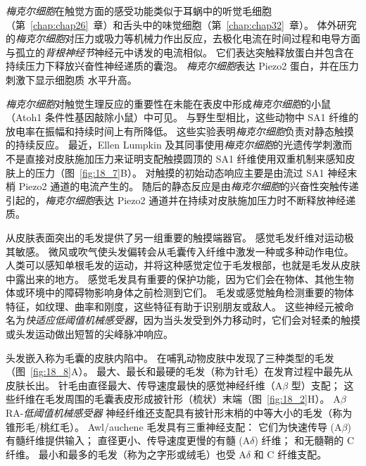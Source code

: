 \textit{梅克尔细胞}在触觉方面的感受功能类似于耳蜗中的听觉毛细胞（第~\ref{chap:chap26}~章）和舌头中的味觉细胞（第~\ref{chap:chap32}~章）。
体外研究的\textit{梅克尔细胞}对压力或吸力等机械力作出反应，去极化电流在时间过程和电导方面与孤立的\textit{背根神经节}神经元中诱发的电流相似。
它们表达突触释放蛋白并包含在持续压力下释放兴奋性神经递质的囊泡。
\textit{梅克尔细胞}表达 Piezo2 蛋白，并在压力刺激下显示细胞质  水平升高。


\textit{梅克尔细胞}对触觉生理反应的重要性在未能在表皮中形成\textit{梅克尔细胞}的小鼠（Atoh1 条件性基因敲除小鼠）中可见。
与野生型相比，这些动物中 SA1 纤维的放电率在振幅和持续时间上有所降低。
这些实验表明\textit{梅克尔细胞}负责对静态触摸的持续反应。 
最近，Ellen Lumpkin 及其同事使用\textit{梅克尔细胞}的光遗传学刺激而不是直接对皮肤施加压力来证明支配触摸圆顶的 SA1 纤维使用双重机制来感知皮肤上的压力（图~\ref{fig:18_7}B）。
对触摸的初始动态响应主要是由流过 SA1 神经末梢 Piezo2 通道的电流产生的。
随后的静态反应是由\textit{梅克尔细胞}的兴奋性突触传递引起的，\textit{梅克尔细胞}表达 Piezo2 通道并在持续对皮肤施加压力时不断释放神经递质。


从皮肤表面突出的毛发提供了另一组重要的触摸端器官。 
感觉毛发纤维对运动极其敏感。
微风或吹气使头发偏转会从毛囊传入纤维中激发一种或多种动作电位。
人类可以感知单根毛发的运动，并将这种感觉定位于毛发根部，也就是毛发从皮肤中露出来的地方。
感觉毛发具有重要的保护功能，因为它们会在物体、其他生物体或环境中的障碍物影响身体之前检测到它们。
毛发或感觉触角检测重要的物体特征，如纹理、曲率和刚度，这些特征有助于识别朋友或敌人。
这些神经元被命名为\textit{快适应低阈值机械感受器}，因为当头发受到外力移动时，它们会对轻柔的触摸或头发运动做出短暂的尖峰脉冲响应。


头发嵌入称为毛囊的皮肤内陷中。
在哺乳动物皮肤中发现了三种类型的毛发（图~\ref{fig:18_8}A）。
最大、最长和最硬的毛发（称为针毛）在发育过程中最先从皮肤长出。
针毛由直径最大、传导速度最快的感觉神经纤维（A$\beta$ 型）支配；
这些纤维在毛发周围的毛囊表皮形成披针形（梳状）末端（图~\ref{fig:18_2}H）。
A$\beta$ RA-\textit{低阈值机械感受器} 神经纤维还支配具有披针形末梢的中等大小的毛发（称为锥形毛/桃红毛）。
Awl/auchene 毛发具有三重神经支配：
它们为快速传导 (A$\beta$) 有髓纤维提供输入；
直径更小、传导速度更慢的有髓 (A$\delta$) 纤维；
和无髓鞘的 C 纤维。
最小和最多的毛发（称为之字形或绒毛）也受 A$\delta$ 和 C 纤维支配。


